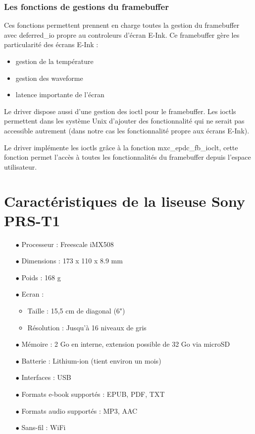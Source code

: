 \subsubsection{Les fonctions de gestions du framebuffer}

Ces fonctions permettent prennent en charge toutes la gestion du framebuffer avec deferred\_io 
propre au controleurs d'écran E-Ink.
Ce framebuffer gère les particularité des écrans E-Ink : 
	\begin{itemize}
		\item gestion de la température
		\item gestion des waveforme
		\item latence importante de l'écran
	\end{itemize}

Le driver dispose aussi d'une gestion des ioctl pour le framebuffer.
Les ioctls permettent dans les système Unix d'ajouter des fonctionnalité qui ne serait pas accessible autrement (dans notre cas les fonctionnalité propre aux écrans E-Ink).

Le driver implémente les ioctls grâce à la fonction mxc\_epdc\_fb\_ioclt, cette fonction permet l'accès à toutes les fonctionnalités du framebuffer depuis l'espace utilisateur.


\section{Caractéristiques de la liseuse Sony PRS-T1}

\begin{itemize}
		\item[$\bullet$] Processeur : Freescale iMX508
		\item[$\bullet$] Dimensions : 173 x 110 x 8.9 mm
		\item[$\bullet$] Poids : 168 g
		\item[$\bullet$] Ecran :
			\begin{itemize}
				\item Taille : 15,5 cm de diagonal (6")
				\item Résolution : Jusqu'à 16 niveaux de gris
			\end{itemize}
		\item[$\bullet$] Mémoire : 2 Go en interne, extension possible de 32 Go via microSD
		\item[$\bullet$] Batterie : Lithium-ion (tient environ un mois)
		\item[$\bullet$] Interfaces : USB
		\item[$\bullet$] Formats e-book supportés : EPUB, PDF, TXT
		\item[$\bullet$] Formats audio supportés : MP3, AAC
		\item[$\bullet$] Sans-fil : WiFi
		
\end{itemize}

